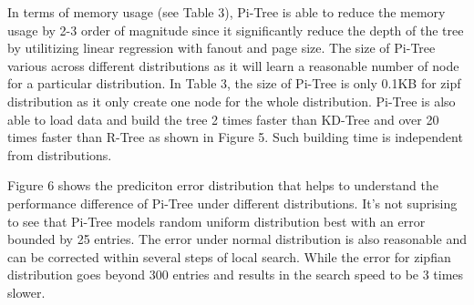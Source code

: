 \documentclass[sigconf,10pt]{acmart}
\begin{document}
In terms of memory usage (see Table 3), Pi-Tree is able to reduce the memory usage by 2-3 order of magnitude
since it significantly reduce the depth of the tree by utilitizing linear regression with fanout and
page size. The size of Pi-Tree various across different distributions as it will learn a reasonable number
of node for a particular distribution. In Table 3, the size of Pi-Tree is only 0.1KB for zipf
distribution as it only create one node for the whole distribution. Pi-Tree is also able to load data and build the tree 2 times faster than KD-Tree and over 20 times
faster than R-Tree as shown in Figure 5. Such building time is independent from distributions.

Figure 6 shows the prediciton error distribution that helps to understand the performance
difference of Pi-Tree under different distributions. It's not suprising to see that Pi-Tree
models random uniform distribution best with an error bounded by 25 entries. The error under
normal distribution is also reasonable and can be corrected within several steps of local
search. While the error for zipfian distribution goes beyond 300 entries and results in the
search speed to be 3 times slower.
\end{document}
